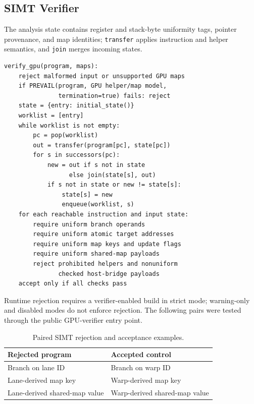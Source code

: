 \newpage
\subsection{SIMT Verifier}
The analysis state contains register and stack-byte uniformity tags, pointer provenance, and map identities; \texttt{transfer} applies instruction and helper semantics, and \texttt{join} merges incoming states.

\begin{lstlisting}[language={},numbers=none,xleftmargin=0pt,columns=fullflexible,keepspaces=true]
verify_gpu(program, maps):
    reject malformed input or unsupported GPU maps
    if PREVAIL(program, GPU helper/map model,
               termination=true) fails: reject
    state = {entry: initial_state()}
    worklist = [entry]
    while worklist is not empty:
        pc = pop(worklist)
        out = transfer(program[pc], state[pc])
        for s in successors(pc):
            new = out if s not in state
                  else join(state[s], out)
            if s not in state or new != state[s]:
                state[s] = new
                enqueue(worklist, s)
    for each reachable instruction and input state:
        require uniform branch operands
        require uniform atomic target addresses
        require uniform map keys and update flags
        require uniform shared-map payloads
        reject prohibited helpers and nonuniform
               checked host-bridge payloads
    accept only if all checks pass
\end{lstlisting}

Runtime rejection requires a verifier-enabled build in strict mode; warning-only and disabled modes do not enforce rejection.
The following pairs were tested through the public GPU-verifier entry point.

\begin{table}[ht]
\centering
\small
\begin{tabularx}{\columnwidth}{@{}XX@{}}
\toprule
Rejected program & Accepted control \\
\midrule
Branch on lane ID & Branch on warp ID \\
Lane-derived map key & Warp-derived map key \\
Lane-derived shared-map value & Warp-derived shared-map value \\
\bottomrule
\end{tabularx}
\caption{Paired SIMT rejection and acceptance examples.}
\label{tab:appendix-simt-pairs}
\end{table}
